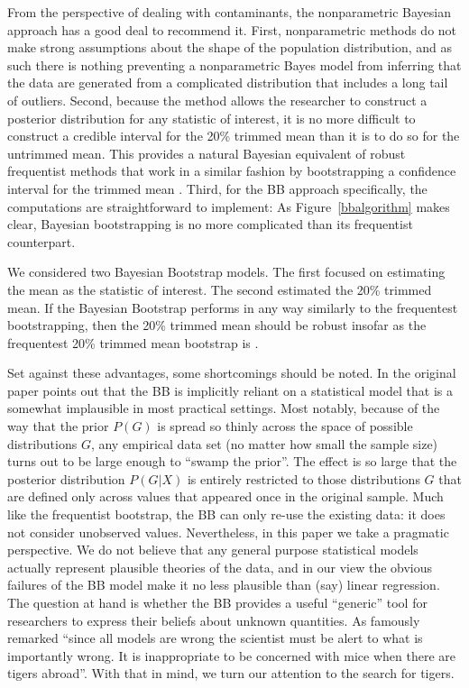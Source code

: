 \documentclass[doc]{apa6}
\begin{document}
{From the perspective of dealing with contaminants, the nonparametric Bayesian approach has a good deal to recommend it. First, nonparametric methods do not make strong assumptions about the shape of the population distribution, and as such there is nothing preventing a nonparametric Bayes model from inferring that the data are generated from a complicated distribution that includes a long tail of outliers. Second, because the method allows the researcher to construct a posterior distribution for any statistic of interest, it is no more difficult to construct a credible interval for the 20\% trimmed mean than it is to do so for the untrimmed mean. This provides a natural Bayesian equivalent of robust frequentist methods that work in a similar fashion by bootstrapping a confidence interval for the trimmed mean \parencite{efron1994introduction}. Third, for the BB approach specifically, the computations are straightforward to implement: As Figure~\ref{bbalgorithm} makes clear, Bayesian bootstrapping is no more complicated than its frequentist counterpart.

We considered two Bayesian Bootstrap models. The first focused on estimating the mean as the statistic of interest. The second estimated the 20\% trimmed mean.   If the Bayesian Bootstrap performs in any way similarly to the frequentest bootstrapping, then the 20\% trimmed mean should be robust insofar as the frequentest 20\% trimmed mean bootstrap is \parencite{wilcox_introduction_2012}.

Set against these advantages, some shortcomings should be noted. In the original paper \textcite{rubin_bayesian_1981} points out that the BB is implicitly reliant on a statistical model that is a somewhat implausible in most practical settings. Most notably, because of the way that the prior $P(G)$ is spread so thinly across the space of possible distributions $G$, any empirical data set (no matter how small the sample size) turns out to be large enough to ``swamp the prior''. The effect is so large that the posterior distribution $P(G|X)$ is entirely restricted to those distributions $G$ that are defined only across values that appeared once in the original sample. Much like the frequentist bootstrap, the BB can only re-use the existing data: it does not consider unobserved values. Nevertheless, in this paper we take a pragmatic perspective. We do not believe that any general purpose statistical models actually represent plausible theories of the data, and in our view the obvious failures of the BB model make it no less plausible than (say) linear regression. The question at hand is whether the BB provides a useful ``generic'' tool for researchers to express their beliefs about unknown quantities. As  \textcite[][p. 792]{box_science_1976} famously remarked ``since all models are wrong the scientist must be alert to what is importantly wrong. It is inappropriate to be concerned with mice when there are tigers abroad''. With that in mind, we turn our attention to the search for tigers.


}
\end{document}
